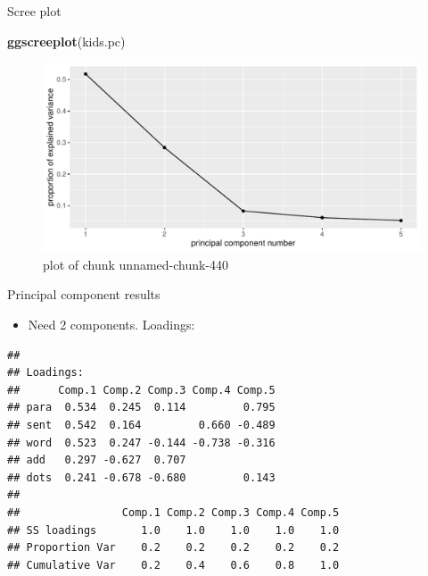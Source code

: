 \documentclass[ignorenonframetext,]{beamer}
\newenvironment{Shaded}{\begin{snugshade}}{\end{snugshade}}
\newcommand{\KeywordTok}[1]{\textcolor[rgb]{0.13,0.29,0.53}{\textbf{#1}}}
\newcommand{\NormalTok}[1]{#1}
\newcommand{\OperatorTok}[1]{\textcolor[rgb]{0.81,0.36,0.00}{\textbf{#1}}}
\providecommand{\tightlist}{%
  \setlength{\itemsep}{0pt}\setlength{\parskip}{0pt}}
\begin{document}
\begin{frame}[fragile]{Scree plot}
\protect\hypertarget{scree-plot-3}{}

\begin{Shaded}
\begin{Highlighting}[]
\KeywordTok{ggscreeplot}\NormalTok{(kids.pc)}
\end{Highlighting}
\end{Shaded}

\begin{figure}
\centering
\includegraphics{figure/unnamed-chunk-440-1.pdf}
\caption{plot of chunk unnamed-chunk-440}
\end{figure}

\end{frame}

\begin{frame}[fragile]{Principal component results}
\protect\hypertarget{principal-component-results}{}

\begin{itemize}
\tightlist
\item
  Need 2 components. Loadings:
\end{itemize}

\footnotesize

\begin{Shaded}
\end{Shaded}

\begin{verbatim}
## 
## Loadings:
##      Comp.1 Comp.2 Comp.3 Comp.4 Comp.5
## para  0.534  0.245  0.114         0.795
## sent  0.542  0.164         0.660 -0.489
## word  0.523  0.247 -0.144 -0.738 -0.316
## add   0.297 -0.627  0.707              
## dots  0.241 -0.678 -0.680         0.143
## 
##                Comp.1 Comp.2 Comp.3 Comp.4 Comp.5
## SS loadings       1.0    1.0    1.0    1.0    1.0
## Proportion Var    0.2    0.2    0.2    0.2    0.2
## Cumulative Var    0.2    0.4    0.6    0.8    1.0
\end{verbatim}

\normalsize

\end{frame}
\end{document}
